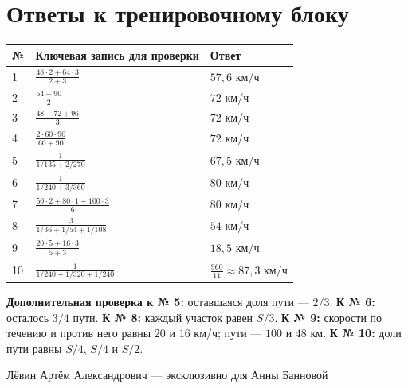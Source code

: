 \documentclass[a4paper,12pt]{article}
\begin{document}
\section*{Ответы к тренировочному блоку}
\begin{center}
\begin{tabularx}{\linewidth}{@{}p{12mm}Yp{55mm}@{}}
\toprule
\textbf{№} & \textbf{Ключевая запись для проверки} & \textbf{Ответ} \\
 & $\displaystyle\frac{48\cdot2+64\cdot3}{2+3}$ & $57{,}6$ км/ч \\
2 & $\displaystyle\frac{54+90}{2}$ & $72$ км/ч \\
3 & $\displaystyle\frac{48+72+96}{3}$ & $72$ км/ч \\
4 & $\displaystyle\frac{2\cdot60\cdot90}{60+90}$ & $72$ км/ч \\
5 & $\displaystyle\frac{1}{1/135+2/270}$ & $67{,}5$ км/ч \\
6 & $\displaystyle\frac{1}{1/240+3/360}$ & $80$ км/ч \\
7 & $\displaystyle\frac{50\cdot2+80\cdot1+100\cdot3}{6}$ & $80$ км/ч \\
8 & $\displaystyle\frac{3}{1/36+1/54+1/108}$ & $54$ км/ч \\
9 & $\displaystyle\frac{20\cdot5+16\cdot3}{5+3}$ & $18{,}5$ км/ч \\
10 & $\displaystyle\frac{1}{1/240+1/320+1/240}$ & $\displaystyle\frac{960}{11}\approx87{,}3$ км/ч \\
\bottomrule
\end{tabularx}
\end{center}
\medskip
\textbf{Дополнительная проверка к № 5:} оставшаяся доля пути --- $2/3$. \textbf{К № 6:} осталось $3/4$ пути. \textbf{К № 8:} каждый участок равен $S/3$. \textbf{К № 9:} скорости по течению и против него равны $20$ и $16$ км/ч; пути --- $100$ и $48$ км. \textbf{К № 10:} доли пути равны $S/4$, $S/4$ и $S/2$.

\vfill
\begin{center}
\textcolor{hint}{Лёвин Артём Александрович --- эксклюзивно для Анны Банновой}\par
\smallskip
{}
\end{center}
\end{document}
